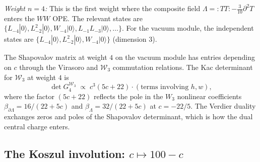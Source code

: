 \documentclass[11pt]{article}
\newcommand{\cW}{\mathcal{W}}
\begin{document}
\medskip
\emph{Weight $n = 4$:}  This is the first weight where the
composite field $\Lambda = {:}TT{:} - \tfrac{3}{10}\partial^2 T$
enters the $WW$ OPE.  The relevant states are
$\{L_{-4}|0\rangle, L_{-2}^2|0\rangle, W_{-4}|0\rangle,
L_{-1}L_{-3}|0\rangle, \ldots\}$.  For the vacuum module,
the independent states are $\{L_{-4}|0\rangle,
L_{-2}^2|0\rangle, W_{-4}|0\rangle\}$ (dimension $3$).

The Shapovalov matrix at weight $4$ on the vacuum module has
entries depending on $c$ through the Virasoro and $\cW_3$
commutation relations.  The Kac determinant
for $\cW_3$ at weight $4$ is
\begin{equation}\label{eq:W3-Kac-det-4}
\det G_4^{\cW_3}
\;\propto\;
c^3(5c + 22) \cdot (\text{terms involving } h, w),
\end{equation}
where the factor $(5c + 22)$ reflects the pole in the $W_3$
nonlinear coefficients
$\beta_{\partial\Lambda}=16/(22+5c)$ and
$\beta_{\Lambda}=32/(22+5c)$ at $c=-22/5$.  The Verdier duality exchanges zeros and poles of
the Shapovalov determinant, which is how the dual central charge
enters.

\subsection{The Koszul involution: $c \mapsto 100 - c$}
\end{document}
